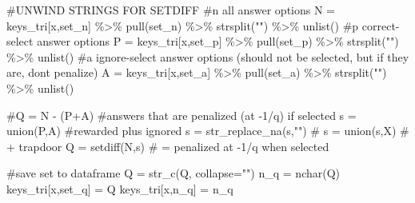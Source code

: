 \documentclass[
  letterpaper,
  DIV=11,
  numbers=noendperiod]{scrreprt}
\newenvironment{Shaded}{\begin{snugshade}}{\end{snugshade}}
\newcommand{\AttributeTok}[1]{\textcolor[rgb]{0.40,0.45,0.13}{#1}}
\newcommand{\CommentTok}[1]{\textcolor[rgb]{0.37,0.37,0.37}{#1}}
\newcommand{\FunctionTok}[1]{\textcolor[rgb]{0.28,0.35,0.67}{#1}}
\newcommand{\NormalTok}[1]{\textcolor[rgb]{0.00,0.23,0.31}{#1}}
\newcommand{\OtherTok}[1]{\textcolor[rgb]{0.00,0.23,0.31}{#1}}
\newcommand{\SpecialCharTok}[1]{\textcolor[rgb]{0.37,0.37,0.37}{#1}}
\newcommand{\StringTok}[1]{\textcolor[rgb]{0.13,0.47,0.30}{#1}}
\begin{document}
\begin{Shaded}
\begin{Highlighting}[]
  \CommentTok{\#UNWIND STRINGS FOR SETDIFF}
  \CommentTok{\#n all answer options}
\NormalTok{  N }\OtherTok{=}\NormalTok{ keys\_tri[x,}\StringTok{\textquotesingle{}set\_n\textquotesingle{}}\NormalTok{] }\SpecialCharTok{\%\textgreater{}\%} \FunctionTok{pull}\NormalTok{(set\_n) }\SpecialCharTok{\%\textgreater{}\%} \FunctionTok{strsplit}\NormalTok{(}\StringTok{""}\NormalTok{) }\SpecialCharTok{\%\textgreater{}\%} \FunctionTok{unlist}\NormalTok{()}
  \CommentTok{\#p correct{-}select answer options}
\NormalTok{  P }\OtherTok{=}\NormalTok{ keys\_tri[x,}\StringTok{\textquotesingle{}set\_p\textquotesingle{}}\NormalTok{] }\SpecialCharTok{\%\textgreater{}\%} \FunctionTok{pull}\NormalTok{(set\_p) }\SpecialCharTok{\%\textgreater{}\%} \FunctionTok{strsplit}\NormalTok{(}\StringTok{""}\NormalTok{) }\SpecialCharTok{\%\textgreater{}\%} \FunctionTok{unlist}\NormalTok{()}
  \CommentTok{\#a ignore{-}select answer options (should not be selected, but if they are, don\textquotesingle{}t penalize)}
\NormalTok{  A }\OtherTok{=}\NormalTok{ keys\_tri[x,}\StringTok{\textquotesingle{}set\_a\textquotesingle{}}\NormalTok{] }\SpecialCharTok{\%\textgreater{}\%} \FunctionTok{pull}\NormalTok{(set\_a) }\SpecialCharTok{\%\textgreater{}\%} \FunctionTok{strsplit}\NormalTok{(}\StringTok{""}\NormalTok{) }\SpecialCharTok{\%\textgreater{}\%} \FunctionTok{unlist}\NormalTok{()}
  
  \CommentTok{\#Q = N {-} (P+A)}
  \CommentTok{\#answers that are penalized (at {-}1/q) if selected }
\NormalTok{  s }\OtherTok{=} \FunctionTok{union}\NormalTok{(P,A) }\CommentTok{\#rewarded plus ignored }
\NormalTok{  s }\OtherTok{=} \FunctionTok{str\_replace\_na}\NormalTok{(s,}\StringTok{""}\NormalTok{)}
  \CommentTok{\# s = union(s,X) \# + trapdoor }
\NormalTok{  Q }\OtherTok{=} \FunctionTok{setdiff}\NormalTok{(N,s) }\CommentTok{\# = penalized at {-}1/q when selected }
  
  \CommentTok{\#save set to dataframe}
\NormalTok{  Q }\OtherTok{=} \FunctionTok{str\_c}\NormalTok{(Q, }\AttributeTok{collapse=}\StringTok{""}\NormalTok{)}
\NormalTok{  n\_q }\OtherTok{=} \FunctionTok{nchar}\NormalTok{(Q)}
\NormalTok{  keys\_tri[x,}\StringTok{\textquotesingle{}set\_q\textquotesingle{}}\NormalTok{] }\OtherTok{=}\NormalTok{ Q}
\NormalTok{  keys\_tri[x,}\StringTok{\textquotesingle{}n\_q\textquotesingle{}}\NormalTok{] }\OtherTok{=}\NormalTok{ n\_q}
  

\end{Highlighting}
\end{Shaded}
\end{document}
